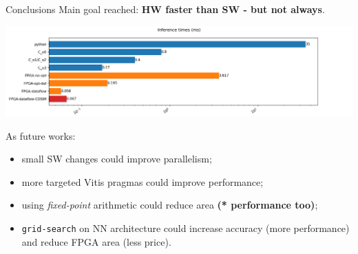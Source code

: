 \documentclass[10pt, xcolor=dvipsnames, compress]{beamer}
\begin{document}
\begin{frame}{Conclusions}
    Main goal reached: \textbf{HW faster than SW - but not always}.
    \begin{center}
        \includegraphics[width=.8\textwidth]{times.png}
    \end{center}

    As future works:
    \begin{itemize}
        \item small SW changes could improve parallelism;
        \item more targeted Vitis pragmas could improve performance;
        \item using \textit{fixed-point} arithmetic could reduce area
        \textbf{(* performance too)};
        \item \texttt{grid-search} on NN architecture could increase accuracy
        (more performance) and reduce FPGA area (less price).
    \end{itemize}


\end{frame}

\appendix
\end{document}
